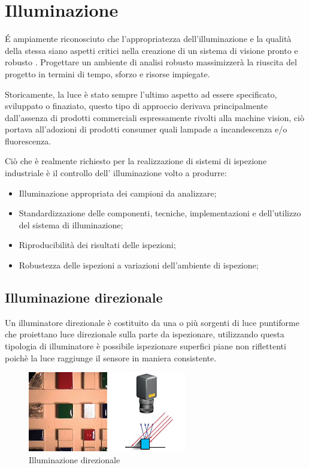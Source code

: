 \section{Illuminazione}

 \'{E} ampiamente riconosciuto che l'appropriatezza
dell'illuminazione e la qualità della stessa siano aspetti critici nella
creazione di un sistema di visione pronto e robusto \cite{doi:10.1117/12.467381}. Progettare un ambiente di
analisi robusto massimizzerà la riuscita del progetto in termini di tempo,
sforzo e risorse impiegate.

Storicamente, la luce è stato sempre l'ultimo aspetto ad essere specificato,
sviluppato o finaziato, questo tipo di approccio derivava principalmente
dall'assenza di prodotti commerciali espressamente rivolti alla machine
vision, ciò portava all'adozioni di prodotti consumer quali lampade a
incandescenza e/o fluorescenza.

Ciò che è realmente richiesto per la realizzazione di sistemi di ispezione
industriale è il controllo dell' illuminazione volto a produrre:

\begin{itemize}
	\item Illuminazione appropriata dei campioni da analizzare;
	\item Standardizzazione delle componenti, tecniche, implementazioni e dell'utilizzo del sistema di illuminazione;
	\item Riproducibilità dei risultati delle ispezioni;
	\item Robustezza delle ispezioni a variazioni dell'ambiente di ispezione;
\end{itemize} 

\subsection{Illuminazione direzionale}

Un illuminatore direzionale è costituito da una o più 
sorgenti di luce puntiforme che proiettano luce direzionale 
sulla parte da ispezionare, utilizzando questa tipologia di 
illuminatore è possibile ispezionare superfici piane non 
riflettenti poichè la luce raggiunge il sensore in maniera consistente. 

\begin{figure}
\centering
\includegraphics[width=.3\textwidth]{img/illuminazione-direzionale.jpg}
\caption{Illuminazione direzionale}\label{fig:illuminazione-direzionale}
\end{figure}

